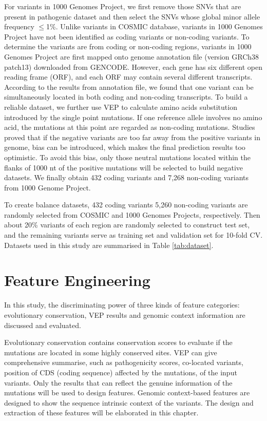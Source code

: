 \documentclass[a4paper,nohyper,nobib,openany,justified]{tufte-book}
\begin{document}
\begin{fullwidth}
For variants in 1000 Genomes Project, we first remove those SNVs that are present in pathogenic dataset and then select the SNVs whose global minor allele frequency $\leqslant$1\%. Unlike variants in COSMIC database, variants in 1000 Genomes Project have not been identified as coding variants or non-coding variants. To determine the variants are from coding or non-coding regions, variants in 1000 Genomes Project are first mapped onto genome annotation file (version GRCh38 patch13) downloaded from GENCODE. However, each gene has six different open reading frame (ORF), and each ORF may contain several different transcripts. According to the results from annotation file, we found that one variant can be simultaneously located in both coding and non-coding transcripts. To build a reliable dataset, we further use VEP to calculate amino acids substitution introduced by the single point mutations. If one reference allele involves no amino acid, the mutations at this point are regarded as non-coding mutations. Studies proved that if the negative variants are too far away from the positive variants in genome, bias can be introduced, which makes the final prediction results too optimistic. To avoid this bias, only those neutral mutations located within the flanks of 1000 nt of the positive mutations will be selected to build negative datasets. We finally obtain 432 coding variants and 7,268 non-coding variants from 1000 Genome Project.

To create balance datasets, 432 coding variants 5,260 non-coding variants are randomly selected from COSMIC and 1000 Genomes Projects, respectively. Then about 20\% variants of each region are randomly selected to construct test set, and the remaining variants serve as training set and validation set for 10-fold CV. Datasets used in this study are summarised in Table \ref{tab:dataset}.

\clearpage
\chapter{Feature Engineering}

In this study, the discriminating power of three kinds of feature categories: evolutionary conservation, VEP results and genomic context information are discussed and evaluated.

Evolutionary conservation contains conservation scores to evaluate if the mutations are located in some highly conserved sites. VEP can give comprehensive summarise, such as pathogenicity scores, co-located variants, position of CDS (coding sequence) affected by the mutations, of the input variants. Only the results that can reflect the genuine information of the mutations will be used to design features. Genomic context-based features are designed to show the sequence intrinsic context of the variants. The design and extraction of these features will be elaborated in this chapter.



\end{fullwidth}
\end{document}
